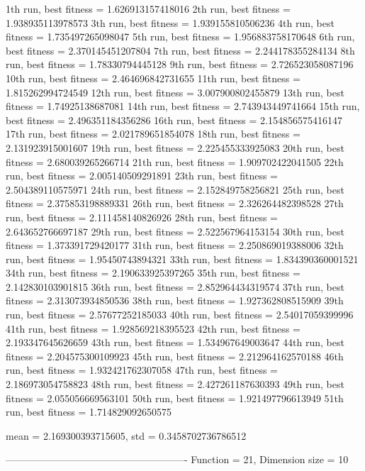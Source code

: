 1th run, best fitness = 1.626913157418016
2th run, best fitness = 1.938935113978573
3th run, best fitness = 1.939155810506236
4th run, best fitness = 1.735497265098047
5th run, best fitness = 1.956883758170648
6th run, best fitness = 2.370145451207804
7th run, best fitness = 2.244178355284134
8th run, best fitness = 1.78330794445128
9th run, best fitness = 2.726523058087196
10th run, best fitness = 2.464696842731655
11th run, best fitness = 1.815262994724549
12th run, best fitness = 3.007900802455879
13th run, best fitness = 1.74925138687081
14th run, best fitness = 2.743943449741664
15th run, best fitness = 2.496351184356286
16th run, best fitness = 2.154856575416147
17th run, best fitness = 2.021789651854078
18th run, best fitness = 2.131923915001607
19th run, best fitness = 2.225455333925083
20th run, best fitness = 2.680039265266714
21th run, best fitness = 1.909702422041505
22th run, best fitness = 2.005140509291891
23th run, best fitness = 2.504389110575971
24th run, best fitness = 2.152849758256821
25th run, best fitness = 2.375853198889331
26th run, best fitness = 2.326264482398528
27th run, best fitness = 2.111458140826926
28th run, best fitness = 2.643652766697187
29th run, best fitness = 2.522567964153154
30th run, best fitness = 1.373391729420177
31th run, best fitness = 2.250869019388006
32th run, best fitness = 1.95450743894321
33th run, best fitness = 1.834390360001521
34th run, best fitness = 2.190633925397265
35th run, best fitness = 2.142830103901815
36th run, best fitness = 2.852964434319574
37th run, best fitness = 2.313073934850536
38th run, best fitness = 1.927362808515909
39th run, best fitness = 2.57677252185033
40th run, best fitness = 2.54017059399996
41th run, best fitness = 1.928569218395523
42th run, best fitness = 2.193347645626659
43th run, best fitness = 1.534967649003647
44th run, best fitness = 2.204575300109923
45th run, best fitness = 2.212964162570188
46th run, best fitness = 1.932421762307058
47th run, best fitness = 2.186973054758823
48th run, best fitness = 2.427261187630393
49th run, best fitness = 2.055056669563101
50th run, best fitness = 1.921497796613949
51th run, best fitness = 1.714829092650575

mean = 2.169300393715605, std = 0.3458702736786512

-------------------------------------------------------
Function = 21, Dimension size = 10

